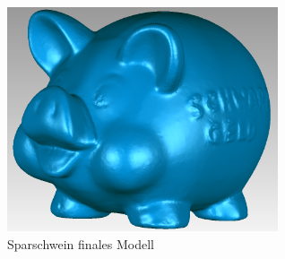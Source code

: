 \documentclass[]{article}
\begin{document}
\begin{figure}[p]
\centering
\caption{Sparschwein finales Modell}
\includegraphics[width=80mm]{images/sparschwein/final} %
\end{figure}
		
\end{document}
